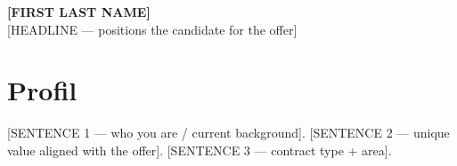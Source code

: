 \documentclass[a4paper,10pt]{article}
\newcommand{\cvname}[1]{{\Huge\bfseries\color{primary} #1}}
\newcommand{\cvheadline}[1]{{\Large\color{muted} #1}}
\begin{document}
\begin{center}
    \cvname{[FIRST LAST NAME]}\\[3pt]
    \cvheadline{[HEADLINE — positions the candidate for the offer]}
\end{center}
\vspace{4pt}

\section*{Profil}
\small
[SENTENCE 1 — who you are / current background]. [SENTENCE 2 — unique value aligned with the offer]. [SENTENCE 3 — contract type + area].

\vspace{2pt}
\end{document}
